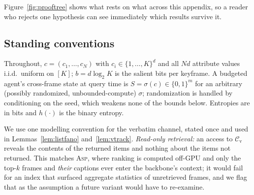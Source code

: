 \documentclass[10pt]{article}
\theoremstyle{definition}
\theoremstyle{plain}
\newcommand{\ASP}{\textsc{Asp}}
\newcommand{\cv}{\mathcal{C}_{\mathrm{v}}}
\begin{document}
Figure~\ref{fig:prooftree} shows what rests on what across this appendix, so a reader who rejects one hypothesis can see immediately which results survive it.

\subsection{Standing conventions}
\label{app:conv}
Throughout, $c=(c_1,\dots,c_N)$ with $c_i\in\{1,\dots,K\}^{d}$ and all $Nd$ attribute values i.i.d.\ uniform on $[K]$; $b=d\log_2K$ is the salient bits per keyframe. A budgeted agent's cross-frame state at query time is $S=\sigma(c)\in\{0,1\}^m$ for an arbitrary (possibly randomized, unbounded-compute) $\sigma$; randomization is handled by conditioning on the seed, which weakens none of the bounds below. Entropies are in bits and $h(\cdot)$ is the binary entropy.

We use one modelling convention for the verbatim channel, stated once and used in Lemmas~\ref{lem:listfano} and~\ref{lem:vtrack}. \emph{Read-only retrieval:} an access to $\cv$ reveals the contents of the returned items and nothing about the items not returned. This matches \ASP{}, where ranking is computed off-GPU and only the top-$k$ frames and \emph{their} captions ever enter the backbone's context; it would fail for an index that surfaced aggregate statistics of unretrieved frames, and we flag that as the assumption a future variant would have to re-examine.
\end{document}
